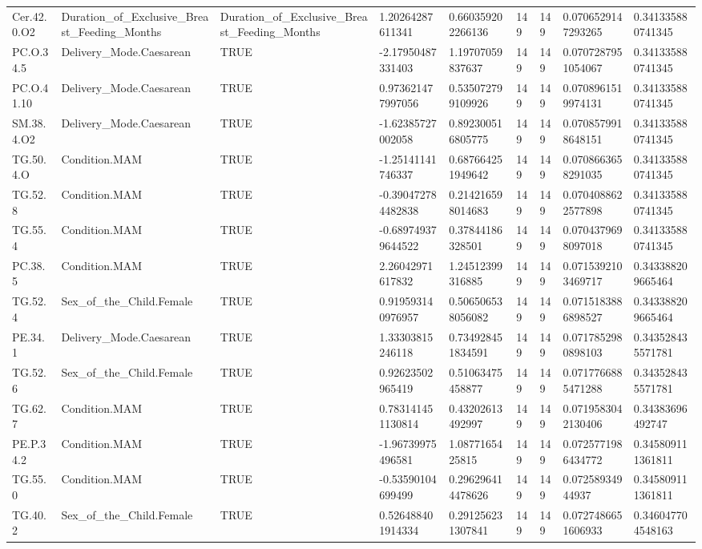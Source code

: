 \begin{longtable}{lllllllll}
Cer.42.0.O2 & Duration\_of\_Exclusive\_Breast\_Feeding\_Months & Duration\_of\_Exclusive\_Breast\_Feeding\_Months & 1.20264287611341 & 0.660359202266136 & 149 & 149 & 0.0706529147293265 & 0.341335880741345 \\
PC.O.34.5 & Delivery\_Mode.Caesarean & TRUE & -2.17950487331403 & 1.19707059837637 & 149 & 149 & 0.0707287951054067 & 0.341335880741345 \\
PC.O.41.10 & Delivery\_Mode.Caesarean & TRUE & 0.973621477997056 & 0.535072799109926 & 149 & 149 & 0.0708961519974131 & 0.341335880741345 \\
SM.38.4.O2 & Delivery\_Mode.Caesarean & TRUE & -1.62385727002058 & 0.892300516805775 & 149 & 149 & 0.0708579918648151 & 0.341335880741345 \\
TG.50.4.O & Condition.MAM & TRUE & -1.25141141746337 & 0.687664251949642 & 149 & 149 & 0.0708663658291035 & 0.341335880741345 \\
TG.52.8 & Condition.MAM & TRUE & -0.390472784482838 & 0.214216598014683 & 149 & 149 & 0.0704088622577898 & 0.341335880741345 \\
TG.55.4 & Condition.MAM & TRUE & -0.689749379644522 & 0.37844186328501 & 149 & 149 & 0.0704379698097018 & 0.341335880741345 \\
PC.38.5 & Condition.MAM & TRUE & 2.26042971617832 & 1.24512399316885 & 149 & 149 & 0.0715392103469717 & 0.343388209665464 \\
TG.52.4 & Sex\_of\_the\_Child.Female & TRUE & 0.919593140976957 & 0.506506538056082 & 149 & 149 & 0.0715183886898527 & 0.343388209665464 \\
PE.34.1 & Delivery\_Mode.Caesarean & TRUE & 1.33303815246118 & 0.734928451834591 & 149 & 149 & 0.0717852980898103 & 0.343528435571781 \\
TG.52.6 & Sex\_of\_the\_Child.Female & TRUE & 0.92623502965419 & 0.51063475458877 & 149 & 149 & 0.0717766885471288 & 0.343528435571781 \\
TG.62.7 & Condition.MAM & TRUE & 0.783141451130814 & 0.43202613492997 & 149 & 149 & 0.0719583042130406 & 0.34383696492747 \\
PE.P.34.2 & Condition.MAM & TRUE & -1.96739975496581 & 1.0877165425815 & 149 & 149 & 0.0725771986434772 & 0.345809111361811 \\
TG.55.0 & Condition.MAM & TRUE & -0.53590104699499 & 0.296296414478626 & 149 & 149 & 0.07258934944937 & 0.345809111361811 \\
TG.40.2 & Sex\_of\_the\_Child.Female & TRUE & 0.526488401914334 & 0.291256231307841 & 149 & 149 & 0.0727486651606933 & 0.346047704548163 \\

\end{longtable}

